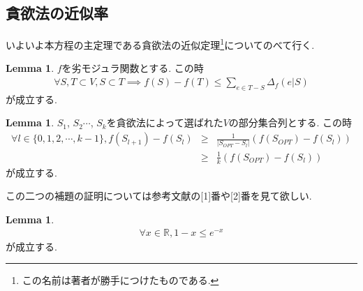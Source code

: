 \documentclass[11pt, a4paper, dvipdfmx]{jsarticle}
\theoremstyle{definition}
\newtheorem{Lemma+}[Axiom+]{Lemma}
\newcommand{\R}{\mathbb{R}}
\begin{document}
\subsection{貪欲法の近似率}
いよいよ本方程の主定理である貪欲法の近似定理\footnote{この名前は著者が勝手につけたものである.}についてのべて行く.
\begin{Lemma+}
    $f$を劣モジュラ関数とする. この時
    \begin{align*}
        \forall S, T\subset V, S\subset T\implies f(S) - f(T)\leq \sum_{e\in T - S}\Delta_{f}(e|S)
    \end{align*}
    が成立する.
\end{Lemma+}
\begin{Lemma+}
    $S_{1}$, $S_{2}$$\cdots$, $S_{k}$を貪欲法によって選ばれた$V$の部分集合列とする. この時
    \begin{eqnarray*}
        \forall l\in\{0, 1, 2, \cdots, k - 1\}, f(S_{l + 1}) -f(S_{l})&\geq& \frac{1}{|S_{OPT} - S_{l}|}(f(S_{OPT}) - f(S_{l})) \\
                                                               &\geq& \frac{1}{k}(f(S_{OPT}) - f(S_{l}))
    \end{eqnarray*}
    が成立する.
\end{Lemma+}
この二つの補題の証明については参考文献の[1]番や[2]番を見て欲しい.
\begin{Lemma+}
    \begin{align*}
        \forall x\in\R, 1 - x\leq e^{-x}
    \end{align*}
    が成立する.
\end{Lemma+}
\end{document}
